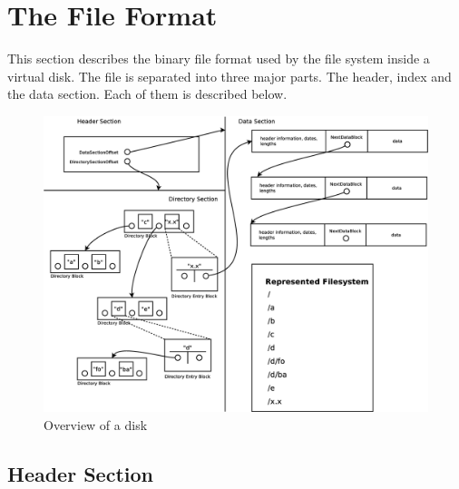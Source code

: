 
\section{The File Format}


This section describes the binary file format used by the file system inside a
virtual disk.
The file is separated into three major parts. The header, index and the data
section. Each of them is described below.

\begin{figure}[h!]
\centering
\includegraphics[width=1\textwidth]{figures/fileFormat.eps}
\caption{Overview of a disk}
\label{fig:disk_overview}
\end{figure}

\subsection{Header Section}


